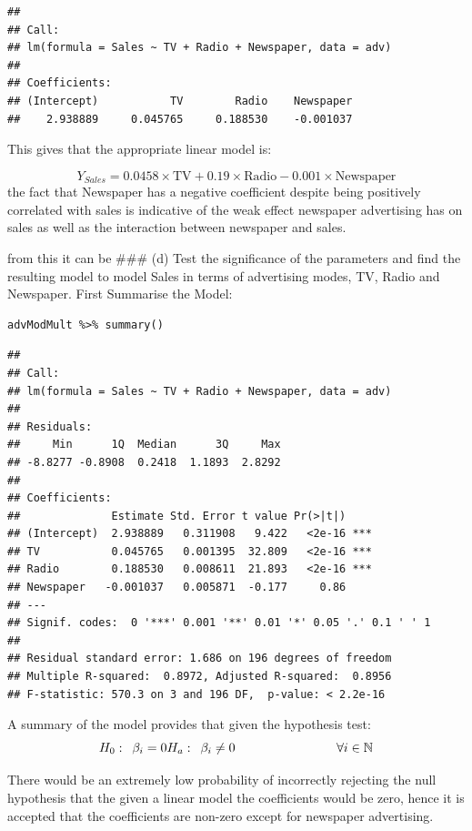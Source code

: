 \documentclass[11pt]{article}
\begin{document}
\begin{verbatim}
## 
## Call:
## lm(formula = Sales ~ TV + Radio + Newspaper, data = adv)
## 
## Coefficients:
## (Intercept)           TV        Radio    Newspaper  
##    2.938889     0.045765     0.188530    -0.001037
\end{verbatim}

This gives that the appropriate linear model is:

$$
  Y_{Sales} = 0.0458 \times \text{TV} + 0.19 \times \text{Radio} - 0.001 \times \text{Newspaper}
  $$ the fact that Newspaper has a negative coefficient despite being
positively correlated with sales is indicative of the weak effect
newspaper advertising has on sales as well as the interaction between
newspaper and sales.

from this it can be \#\#\# (d) Test the significance of the parameters and
find the resulting model to model Sales in terms of advertising modes,
TV, Radio and Newspaper. First Summarise the Model:

\begin{verbatim}
advModMult %>% summary()
\end{verbatim}

\begin{verbatim}
## 
## Call:
## lm(formula = Sales ~ TV + Radio + Newspaper, data = adv)
## 
## Residuals:
##     Min      1Q  Median      3Q     Max 
## -8.8277 -0.8908  0.2418  1.1893  2.8292 
## 
## Coefficients:
##              Estimate Std. Error t value Pr(>|t|)    
## (Intercept)  2.938889   0.311908   9.422   <2e-16 ***
## TV           0.045765   0.001395  32.809   <2e-16 ***
## Radio        0.188530   0.008611  21.893   <2e-16 ***
## Newspaper   -0.001037   0.005871  -0.177     0.86    
## ---
## Signif. codes:  0 '***' 0.001 '**' 0.01 '*' 0.05 '.' 0.1 ' ' 1
## 
## Residual standard error: 1.686 on 196 degrees of freedom
## Multiple R-squared:  0.8972, Adjusted R-squared:  0.8956 
## F-statistic: 570.3 on 3 and 196 DF,  p-value: < 2.2e-16
\end{verbatim}

A summary of the model provides that given the hypothesis test: $$
  H_0: \enspace \beta_i = 0\\
  H_a: \enspace \beta_i \neq 0 \\
  \qquad \qquad \qquad \qquad \forall i \in \mathbb{N}
  $$

There would be an extremely low probability of incorrectly rejecting the
null hypothesis that the given a linear model the coefficients would be
zero, hence it is accepted that the coefficients are non-zero except for
newspaper advertising.
\end{document}
